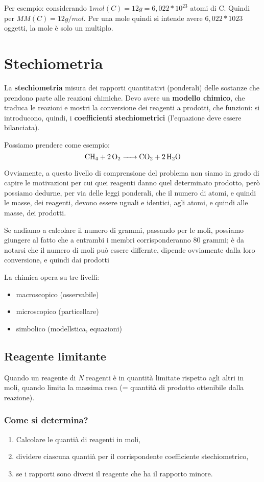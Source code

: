 Per esempio: considerando $1 mol(C) = 12g = 6,022*10^{23}$ atomi di C. Quindi per $MM(C)=12g/mol$. Per una mole quindi si intende avere $6,022*10{23}$ oggetti, la mole è solo un multiplo. 

\section{Stechiometria}

La \textbf{stechiometria} misura dei rapporti quantitativi (ponderali) delle sostanze che prendono parte alle reazioni chimiche. Devo avere un \textbf{modello chimico}, che traduca le reazioni e mostri la conversione dei reagenti a prodotti, che funzioni: si introducono, quindi, i \textbf{coefficienti stechiometrici} (l'equazione deve essere bilanciata).

Possiamo prendere come esempio: \[\ce{CH4 + 2O2 -> CO2 + 2H2O}\] 

Ovviamente, a questo livello di comprensione del problema non siamo in grado di capire le motivazioni per cui quei reagenti danno quel determinato prodotto, però possiamo dedurne, per via delle leggi ponderali, che il numero di atomi, e quindi le masse, dei reagenti, devono essere uguali e identici, agli atomi, e quindi alle masse, dei prodotti. 

Se andiamo a calcolare il numero di grammi, passando per le moli, possiamo giungere al fatto che a entrambi i membri corrisponderanno 80 grammi; è da notarsi che il numero di moli può essere differnte, dipende ovviamente dalla loro conversione, e quindi dai prodotti

La chimica opera su tre livelli: 
\begin{itemize}
\item macroscopico (osservabile)
\item microscopico (particellare)
\item simbolico (modellstica, equazioni)
\end{itemize}


\subsection{Reagente limitante}
Quando un reagente di \emph{N} reagenti è in quantità limitate rispetto agli altri in moli, quando limita la massima resa (= quantità di prodotto ottenibile dalla reazione).

\subsubsection{Come si determina?}
\begin{enumerate}
    \item Calcolare le quantià di reagenti in moli,
    \item dividere ciascuna quantià per il corrispondente coefficiente stechiometrico,
    \item se i rapporti sono diversi il reagente che ha il rapporto minore.
\end{enumerate}

